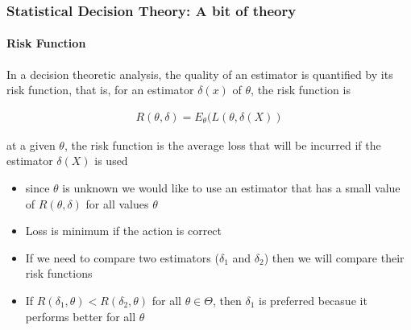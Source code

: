 \documentclass[
  shownotes,
  xcolor={svgnames},
  hyperref={colorlinks,citecolor=DarkBlue,linkcolor=DarkRed,urlcolor=DarkBlue}
  ]{beamer}
\begin{document}
\begin{frame}
\frametitle{Statistical Decision Theory: A bit of theory}
\framesubtitle{Risk Function}
In a decision theoretic analysis, the quality of an estimator is quantified by its risk function, that is, for an estimator $\delta(x)$ of $\theta$, the risk function is

\begin{align}
      R(\theta,\delta)=E_\theta (L(\theta,\delta(X))
    \end{align}

    at a given $\theta$, the risk function is the average loss that will be incurred if the estimator $\delta(X)$ is used


\begin{itemize}
\item since $\theta$ is unknown we would like to use an estimator that has a small value of $R(\theta,\delta)$ for all values $\theta$
\item Loss is minimum if the action is correct
\item If we need to compare two estimators ($\delta_1$ and $\delta_2$) then we will compare their risk functions
\item If $R(\delta_1,\theta)<R(\delta_2,\theta)$ for all $\theta \in \Theta$, then $\delta_1$ is preferred becasue it performs better for all $\theta$

\end{itemize}

\end{frame}
\end{document}
